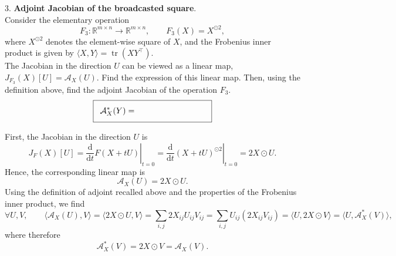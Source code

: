 \documentclass{article}
\theoremstyle{definition}
\theoremstyle{remark}
\begin{document}
3. \textbf{Adjoint Jacobian of the broadcasted square}. \vspace{0.2cm}\\
Consider the elementary operation
\[
F_3: \mathbb{R}^{m \times n} \rightarrow \mathbb{R}^{m \times n},
\qquad
F_3(X) = X^{\odot 2},
\]
where $X^{\odot 2}$ denotes the element-wise square of $X$, and the Frobenius
inner product is given by $\langle X, Y\rangle = \operatorname{tr}(XY^\top)$.
\vspace{0.2cm}\\
The Jacobian in the direction $U$ can be viewed as a linear map,
$J_{F_3}(X)[U] = \mathcal{A}_X(U)$. Find the expression of this linear map.
Then, using the definition above, find the adjoint Jacobian of the operation $F_3$.
\vspace{0.2cm}\\
\[
\setlength{\fboxsep}{8pt}
\fbox{$\displaystyle \mathcal{A}_X^*(Y) = \hspace{3cm}$}
\]
\begin{solution}
First, the Jacobian in the direction $U$ is
\[
    J_F(X)[U]
    =
    \left.\frac{\mathrm{d}}{\mathrm{d}t}
    F(X+tU)\right|_{t=0}
    =
    \left.\frac{\mathrm{d}}{\mathrm{d}t}
    (X+tU)^{\odot 2}\right|_{t=0}
    =
    2X\odot U.
\]
Hence, the corresponding linear map is
\[
    \mathcal{A}_X(U)=2X\odot U.
\]
Using the definition of adjoint recalled above and the properties of the
Frobenius inner product, we find
\[
    \forall U, V, \qquad
    \langle \mathcal{A}_X(U), V \rangle
    =
    \langle 2X \odot U, V \rangle
    =
    \sum_{i,j} 2X_{ij}U_{ij}V_{ij}
    =
    \sum_{i,j} U_{ij}(2X_{ij}V_{ij})
    =
    \langle U, 2X \odot V \rangle
    =
    \langle U, \mathcal{A}_X^*(V) \rangle,
\]
where therefore
\[
    \mathcal{A}_X^*(V)=2X\odot V = \mathcal{A}_X(V).
\]
\end{solution}
\end{document}
